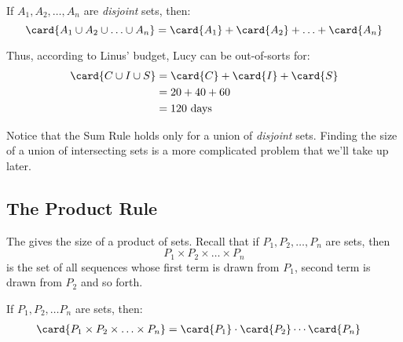 \begin{mathrule}
If $A_1, A_2, \ldots, A_n$ are \emph{disjoint} sets, then:
%
\[
\card{A_1 \cup A_2 \cup \ldots \cup A_n}
    = \card{A_1} + \card{A_2} + \ldots + \card{A_n}
\]
\end{mathrule}

Thus, according to Linus' budget, Lucy can be out-of-sorts for:
%
\begin{align*}
\card{C \cup I \cup S}
    & = \card{C} + \card{I} + \card{S} \\
    & = 20 + 40 + 60 \\
    & = 120 \text{ days}
\end{align*}

Notice that the Sum Rule holds only for a union of {\em disjoint}
sets.  Finding the size of a union of intersecting sets is a more
complicated problem that we'll take up later.

\subsection{The Product Rule}

The  gives the size of a product of sets.  Recall that
if $P_1, P_2, \ldots, P_n$ are sets, then
%
\[
P_1 \times P_2 \times \ldots \times P_n
\]
%
is the set of all sequences whose first term is drawn from $P_1$,
second term is drawn from $P_2$ and so forth.

\begin{mathrule}
If $P_1, P_2, \ldots P_n$ are sets, then:
%
\begin{align*}
\card{P_1 \times P_2 \times \ldots \times P_n}
    & = \card{P_1} \cdot \card{P_2} \cdots \card{P_n}
\end{align*}
\end{mathrule}

